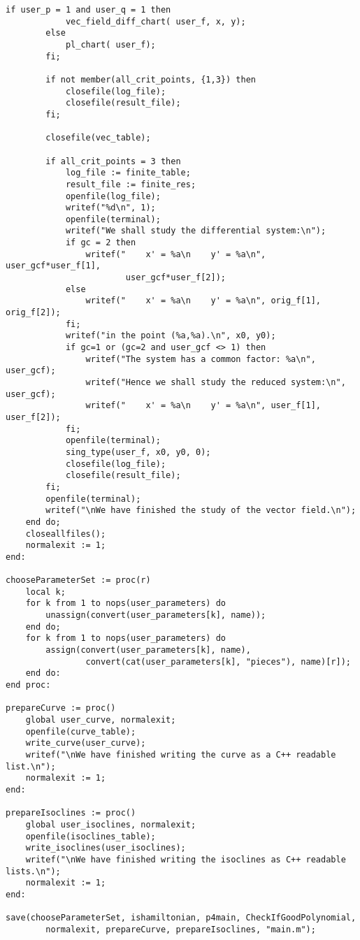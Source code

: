 \documentclass[a4paper,10pt]{article}
\begin{document}
\begin{lstlisting}[name=main]
        if user_p = 1 and user_q = 1 then
            vec_field_diff_chart( user_f, x, y);
        else
            pl_chart( user_f);
        fi;

        if not member(all_crit_points, {1,3}) then
            closefile(log_file);
            closefile(result_file);
        fi;

        closefile(vec_table);

        if all_crit_points = 3 then
            log_file := finite_table;
            result_file := finite_res;
            openfile(log_file);
            writef("%d\n", 1);
            openfile(terminal);
            writef("We shall study the differential system:\n");
            if gc = 2 then
                writef("    x' = %a\n    y' = %a\n", user_gcf*user_f[1],
                        user_gcf*user_f[2]);
            else
                writef("    x' = %a\n    y' = %a\n", orig_f[1], orig_f[2]);
            fi;
            writef("in the point (%a,%a).\n", x0, y0);
            if gc=1 or (gc=2 and user_gcf <> 1) then
                writef("The system has a common factor: %a\n", user_gcf);
                writef("Hence we shall study the reduced system:\n", user_gcf);
                writef("    x' = %a\n    y' = %a\n", user_f[1], user_f[2]);
            fi;
            openfile(terminal);
            sing_type(user_f, x0, y0, 0);
            closefile(log_file);
            closefile(result_file);
        fi;
        openfile(terminal);
        writef("\nWe have finished the study of the vector field.\n");
    end do;
    closeallfiles();
    normalexit := 1;
end:

chooseParameterSet := proc(r)
    local k;
    for k from 1 to nops(user_parameters) do
        unassign(convert(user_parameters[k], name));
    end do;
    for k from 1 to nops(user_parameters) do
        assign(convert(user_parameters[k], name),
                convert(cat(user_parameters[k], "pieces"), name)[r]);
    end do:
end proc:

prepareCurve := proc()
    global user_curve, normalexit;
    openfile(curve_table);
    write_curve(user_curve);
    writef("\nWe have finished writing the curve as a C++ readable list.\n");    
    normalexit := 1;
end:

prepareIsoclines := proc()
    global user_isoclines, normalexit;
    openfile(isoclines_table);
    write_isoclines(user_isoclines);
    writef("\nWe have finished writing the isoclines as C++ readable lists.\n");
    normalexit := 1;
end:

save(chooseParameterSet, ishamiltonian, p4main, CheckIfGoodPolynomial,
        normalexit, prepareCurve, prepareIsoclines, "main.m");


\end{lstlisting}
\end{document}
